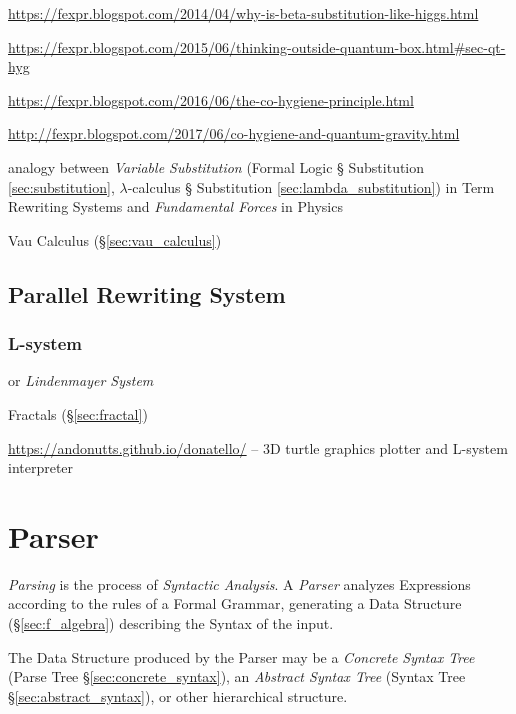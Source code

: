 \url{https://fexpr.blogspot.com/2014/04/why-is-beta-substitution-like-higgs.html}

\url{https://fexpr.blogspot.com/2015/06/thinking-outside-quantum-box.html#sec-qt-hyg}

\url{https://fexpr.blogspot.com/2016/06/the-co-hygiene-principle.html}

\url{http://fexpr.blogspot.com/2017/06/co-hygiene-and-quantum-gravity.html}

analogy between \emph{Variable Substitution} (Formal Logic \S
Substitution \ref{sec:substitution}, $\lambda$-calculus \S
Substitution \ref{sec:lambda_substitution}) in Term Rewriting Systems
and \emph{Fundamental Forces} in Physics

Vau Calculus (\S\ref{sec:vau_calculus})



\subsection{Parallel Rewriting System}\label{sec:parallel_rewriting}

\subsubsection{L-system}\label{sec:l_system}

or \emph{Lindenmayer System}

Fractals (\S\ref{sec:fractal})

\url{https://andonutts.github.io/donatello/} -- 3D turtle graphics plotter and
L-system  interpreter



\section{Parser} \label{sec:parser}

\emph{Parsing} is the process of \emph{Syntactic Analysis}. A
\emph{Parser} analyzes Expressions according to the rules of a Formal
Grammar, generating a Data Structure (\S\ref{sec:f_algebra})
describing the Syntax of the input.

The Data Structure produced by the Parser may be a \emph{Concrete
  Syntax Tree} (Parse Tree \S\ref{sec:concrete_syntax}), an
\emph{Abstract Syntax Tree} (Syntax Tree \S\ref{sec:abstract_syntax}),
or other hierarchical structure.



